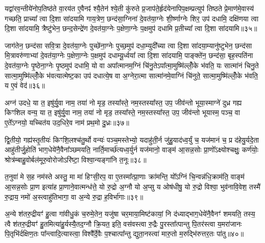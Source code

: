यद्वा॑रव॒न्तीये॑नोप॒तिष्ठ॑ते वा॒रय॑त ए॒वैनꣴ॑ श्यै॒तेन॑ श्ये॒ती कु॑रुते प्र॒जाप॑ते॒र्\mbox{}हृद॑येनापिप॒क्षम्प्रत्युप॑ तिष्ठते प्रे॒माण॑मे॒वास्य॑ गच्छति॒ प्राच्या᳚ त्वा दि॒शा सा॑दयामि गाय॒त्रेण॒ छन्द॑सा॒ग्निना॑ दे॒वत॑या॒ग्नेः शी॒र्ष्णाग्नेः शिर॒ उप॑ दधामि॒ दक्षि॑णया त्वा दि॒शा सा॑दयामि॒ त्रैष्टु॑भेन॒ छन्द॒सेन्द्रे॑ण दे॒वत॑या॒ग्नेः प॒क्षेणा॒ग्नेः प॒क्षमुप॑ दधामि प्र॒तीच्या᳚ त्वा दि॒शा सा॑दयामि॥३५॥

जाग॑तेन॒ छन्द॑सा सवि॒त्रा दे॒वत॑या॒ग्नेः पुच्छे॑ना॒ग्नेः पुच्छ॒मुप॑ दधा॒म्युदी᳚च्या त्वा दि॒शा सा॑दया॒म्यानु॑ष्टुभेन॒ छन्द॑सा मि॒त्रावरु॑णाभ्यां दे॒वत॑या॒ग्नेः प॒क्षेणा॒ग्नेः प॒क्षमुप॑ दधाम्यू॒र्ध्वया᳚ त्वा दि॒शा सा॑दयामि॒ पाङ्क्ते॑न॒ छन्द॑सा॒ बृह॒स्पति॑ना दे॒वत॑या॒ग्नेः पृ॒ष्ठेना॒ग्नेः पृ॒ष्ठमुप॑ दधामि॒ यो वा अपा᳚त्मानम॒ग्निं चि॑नु॒ते\-ऽपा᳚त्मा॒मुष्मि॑ल्लोँ॒के भ॑वति॒ यः सात्मा॑नं चिनु॒ते सात्मा॒मुष्मि॑ल्लोँ॒के भ॑वत्यात्मेष्ट॒का उप॑ दधात्ये॒ष वा अ॒ग्नेरा॒त्मा सात्मा॑नमे॒वाग्निं चि॑नुते॒ सात्मा॒मुष्मि॑ल्लोँ॒के भ॑वति॒ य ए॒वं वेद॑॥३६॥

{\anuvakamend[{श्यै॒त॒त्वं प्र॒तीच्या᳚ त्वा दि॒शा सा॑दयामि॒ यः सात्मा॑नञ्चिनु॒ते द्वाविꣳ॑शतिश्च॥८॥}]}

अग्न॑ उदधे॒ या त॒ इषु॑र्यु॒वा नाम॒ तया॑ नो मृड॒ तस्या᳚स्ते॒ नम॒स्तस्या᳚स्त॒ उप॒ जीव॑न्तो भूया॒स्माग्ने॑ दुध्र गह्य किꣳशिल वन्य॒ या त॒ इषु॑र्यु॒वा नाम॒ तया॑ नो मृड॒ तस्या᳚स्ते॒ नम॒स्तस्या᳚स्त॒ उप॒ जीव॑न्तो भूयास्म॒ पञ्च॒ वा ए॒ते᳚\-ऽग्नयो॒ यच्चित॑य उद॒धिरे॒व नाम॑ प्रथ॒मो दु॒ध्रः॥३७॥

द्वि॒तीयो॒ गह्य॑स्तृ॒तीयः॑ किꣳशि॒लश्च॑तु॒र्थो वन्यः॑ पञ्च॒मस्तेभ्यो॒ यदाहु॑ती॒र्न जु॑हु॒याद॑ध्व॒र्युं च॒ यज॑मानं च॒ प्र द॑हेयु॒र्यदे॒ता आहु॑तीर्जु॒होति॑ भाग॒धेये॑नै॒वैना᳚ञ्छमयति॒ नार्ति॒मार्च्छ॑त्यध्व॒र्युर्न यज॑मानो॒ वाङ्म॑ आ॒सन्न॒सोः प्रा॒णो᳚\-ऽक्ष्योश्चक्षुः॒ कर्ण॑योः॒ श्रोत्र॑म्बाहु॒वोर्बल॑मूरु॒वोरोजो\-ऽरि॑ष्टा॒ विश्वा॒न्यङ्गा॑नि त॒नूः॥३८॥

त॒नुवा॑ मे स॒ह नम॑स्ते अस्तु॒ मा मा॑ हिꣳसी॒रप॒ वा ए॒तस्मा᳚त्प्रा॒णाः क्रा॑मन्ति॒ यो᳚\-ऽग्निं चि॒न्वन्न॑धि॒क्राम॑ति॒ वाङ्म॑ आ॒सन्न॒सोः प्रा॒ण इत्या॑ह प्रा॒णाने॒वात्मन्ध॑त्ते॒ यो रु॒द्रो अ॒ग्नौ यो अ॒प्सु य ओष॑धीषु॒ यो रु॒द्रो विश्वा॒ भुव॑नावि॒वेश॒ तस्मै॑ रु॒द्राय॒ नमो॑ अ॒स्त्वाहु॑तिभागा॒ वा अ॒न्ये रु॒द्रा ह॒विर्भा॑गाः॥३९॥

अ॒न्ये श॑तरु॒द्रीयꣳ॑ हु॒त्वा गा॑वीधु॒कं च॒रुमे॒तेन॒ यजु॑षा चर॒माया॒मिष्ट॑कायां॒ नि द॑ध्याद्भाग॒धेये॑नै॒वैनꣳ॑ शमयति॒ तस्य॒ त्वै श॑तरु॒द्रीयꣳ॑ हु॒तमित्या॑हु॒र्यस्यै॒तद॒ग्नौ क्रि॒यत॒ इति॒ वस॑वस्त्वा रु॒द्रैः पु॒रस्ता᳚त्पान्तु पि॒तर॑स्त्वा य॒मरा॑जानः पि॒तृभि॑र्दक्षिण॒तः पा᳚न्त्वादि॒त्यास्त्वा॒ विश्वै᳚र्दे॒वैः प॒श्चात्पा᳚न्तु द्युता॒नस्त्वा॑ मारु॒तो म॒रुद्भि॑रुत्तर॒तः पा॑तु॥४०॥

